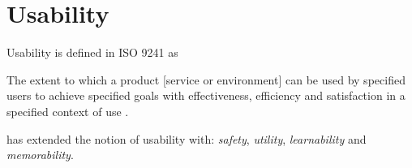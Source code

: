 \section{Usability}
Usability is defined in ISO 9241 as 
\begin{displayquote}
    The extent to which a product [service or environment] can be used by specified users to achieve specified goals with effectiveness, efficiency and satisfaction in a specified context of use \parencite{Petrie2013}.
\end{displayquote} 

\textcite{rogers_interaction_2011} has extended the notion of usability with: \textit{safety}, \textit{utility}, \textit{learnability} and \textit{memorability}.










